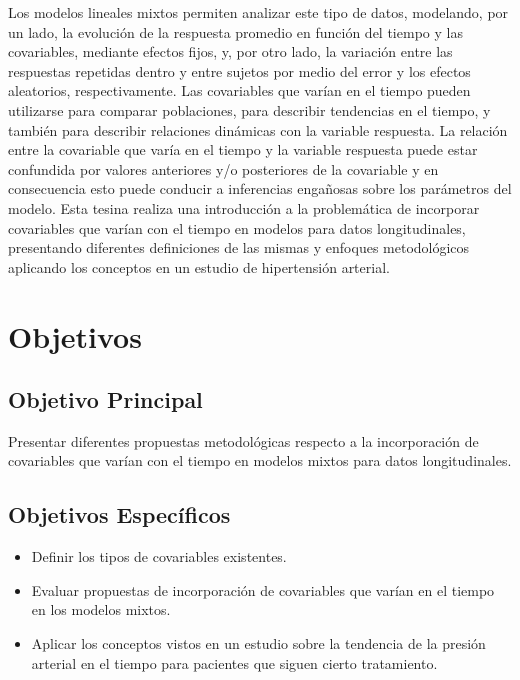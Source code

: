 \documentclass[12pt]{article}
\begin{document}
Los modelos lineales mixtos permiten
analizar este tipo de datos, modelando, por un lado, la evolución de la respuesta promedio en función del tiempo y las
covariables, mediante efectos fijos, y, por otro lado, la variación entre las respuestas repetidas dentro y entre sujetos
por medio del error y los efectos aleatorios, respectivamente. Las covariables que varían en el tiempo pueden
utilizarse para comparar poblaciones, para describir tendencias en el tiempo, y también para describir relaciones
dinámicas con la variable respuesta. La relación entre la covariable que varía en el tiempo y la variable respuesta
puede estar confundida por valores anteriores y/o posteriores de la covariable y en consecuencia esto puede conducir
a inferencias engañosas sobre los parámetros del modelo. Esta tesina realiza una introducción a la problemática de
incorporar covariables que varían con el tiempo en modelos para datos longitudinales, presentando diferentes definiciones
de las mismas y enfoques metodológicos aplicando los conceptos en un estudio de hipertensión arterial. 


\newpage
\section{Objetivos}

\subsection{Objetivo Principal}

Presentar diferentes propuestas metodológicas respecto a la incorporación de covariables que varían con el tiempo en
modelos mixtos para datos longitudinales.

\subsection{Objetivos Específicos}

\begin{itemize}
	\item Definir los tipos de covariables existentes.
	\item Evaluar propuestas de incorporación de covariables que varían en el tiempo en los modelos mixtos.
	\item Aplicar los conceptos vistos en un estudio sobre la tendencia de la presión arterial en el tiempo para pacientes
		  que siguen cierto tratamiento.
\end{itemize}
\end{document}
